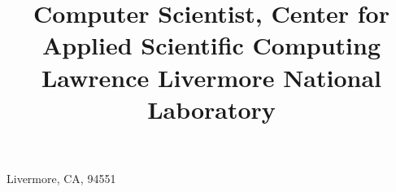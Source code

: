\title{\normalsize
	Computer Scientist,
	Center for Applied Scientific Computing\newline
	Lawrence Livermore National Laboratory
}                       %
\address{P.O. Box 808, L-557}{Livermore, CA, 94551}    %





\newcommand{\see}[1]{\hfill{\itshape\color{see}\footnotesize{}see #1}}

\newcommand{\br}{\ifinner, \else\\\fi}

\newcommand{\github}[1]{\href{https://github.com/LLNL/#1}{#1}}

\makeatletter
\def\@bibitem#1{%
	\def\mykey{#1}%
	\item\if@filesw\immediate\write\@auxout {\string\bibcite{#1}%
	{\the\value{\@listctr}}}\fi\ignorespaces}



